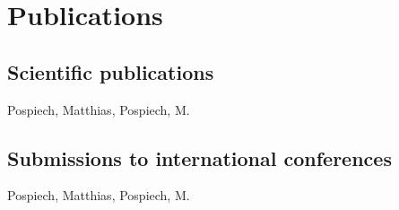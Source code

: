 
\chapter*{Publications}



\section*{Scientific publications}
\begin{refsection}
\nocite{Siegel2007, Palmer2010, Pospiech2009, Pospiech2010, Pospiech2011}
\forcsvlist{\listadd\bibboldnames}
  {{Pospiech, Matthias}, {Pospiech, M.}}
\begin{refcontext}[sorting=nyt]  
	\printbibliography[env=numbered+bold, heading=none, resetnumbers=true]
\end{refcontext}
\end{refsection}

\section*{Submissions to international conferences}
\begin{refsection}
\nocite{Morgner2008, Palmer2008a, Siegel2008,Pospiech2009a,Pospiech2010b,Pospiech2010a}
\forcsvlist{\listadd\bibboldnames}
  {{Pospiech, Matthias}, {Pospiech, M.}}
\begin{refcontext}[sorting=nyt]  
	\printbibliography[env=numbered+bold, heading=none, resetnumbers=true]
\end{refcontext}
\end{refsection}

